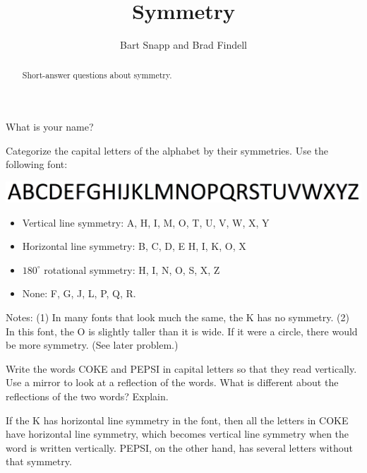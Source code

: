 \documentclass[nooutcomes]{ximera}
\title{Symmetry}
\author{Bart Snapp and Brad Findell}
\begin{document}
\begin{abstract}
Short-answer questions about symmetry. 
\end{abstract}
\maketitle

\begin{question}
What is your name?
\begin{freeResponse}
\end{freeResponse}
\end{question}

\begin{question}
Categorize the capital letters of the alphabet by their symmetries.  Use the following font: 
\begin{image}
\includegraphics{alphabet.png}
\end{image}
\begin{freeResponse}
\begin{hint}

\begin{itemize}
\item Vertical line symmetry:  A, H, I, M, O, T, U, V, W, X, Y
\item Horizontal line symmetry:  B, C, D, E H, I, K, O, X  
\item $180^\circ$ rotational symmetry: H, I, N, O, S, X, Z
\item None: F, G, J, L, P, Q, R.  
\end{itemize}
Notes:  (1) In many fonts that look much the same, the K has no symmetry.  (2) In this font, the O is slightly taller than it is wide.  If it were a circle, there would be more symmetry.  (See later problem.)
\end{hint}
\end{freeResponse}
\end{question}

\begin{question}
Write the words COKE and PEPSI in capital letters so that they read vertically.  Use a mirror to look at a reflection of the words.  What is different about the reflections of the two words?  Explain.  
\begin{freeResponse}
\begin{hint}
If the K has horizontal line symmetry in the font, then all the letters in COKE have horizontal line symmetry, which becomes vertical line symmetry when the word is written vertically. PEPSI, on the other hand, has several letters without that symmetry.  
\end{hint}
\end{freeResponse}
\end{question}
\end{document}
